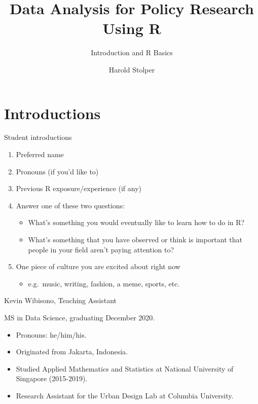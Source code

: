\documentclass[8pt,ignorenonframetext,dvipsnames]{beamer}
\title{Data Analysis for Policy Research Using R}
\subtitle{Introduction and R Basics}
\author{Harold Stolper}
\date{}
\providecommand{\tightlist}{%
  \setlength{\itemsep}{0pt}\setlength{\parskip}{0pt}}
\let\olditem\item
\renewcommand{\item}{%
  \olditem\vspace{4pt}
}
\begin{document}
\frame{\titlepage}

\begin{frame}
\tableofcontents[hideallsubsections]
\end{frame}
\hypertarget{introductions}{%
\section{Introductions}\label{introductions}}

\begin{frame}{Student introductions}
\protect\hypertarget{student-introductions}{}

\begin{enumerate}
\tightlist
\item
  Preferred name
\item
  Pronouns (if you'd like to)
\item
  Previous R exposure/experience (if any)
\item
  Answer one of these two questions:

  \begin{itemize}
  \tightlist
  \item
    What's something you would eventually like to learn how to do in R?
  \item
    What's something that you have observed or think is important that
    people in your field aren't paying attention to?
  \end{itemize}
\item
  One piece of culture you are excited about right now

  \begin{itemize}
  \tightlist
  \item
    e.g.~music, writing, fashion, a meme, sports, etc.
  \end{itemize}
\end{enumerate}

\end{frame}

\begin{frame}{Kevin Wibisono, Teaching Assistant}
\protect\hypertarget{kevin-wibisono-teaching-assistant}{}

MS in Data Science, graduating December 2020.

\medskip

\begin{itemize}
\tightlist
\item
  Pronouns: he/him/his.
\item
  Originated from Jakarta, Indonesia.
\item
  Studied Applied Mathematics and Statistics at National University of
  Singapore (2015-2019).
\item
  Research Assistant for the Urban Design Lab at Columbia University.
\end{itemize}

\end{frame}
\end{document}
